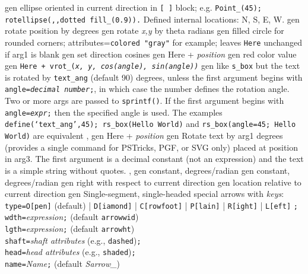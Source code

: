 %
  {gen}%
  {ellipse oriented in current direction in {\tt [ ]} block;
   e.g. {\tt Point\_(45); rotellipse(,{},dotted fill\_(0.9)).} Defined
   internal locations: N, S, E, W.}%
%
  {gen}%
  {rotate position by degrees}%
%
  {gen}%
  {rotate {\sl x,y} by theta radians}%
%
  {gen}%
  {filled circle for rounded corners; attributes={\tt colored
  "gray"}%
   for example; leaves {\tt Here} unchanged if arg1 is blank
    }%
%
  {gen}%
  {set direction cosines}%
%
  {gen}%
  {Here + {\sl position}}%
%
  {gen}%
  {red color value}%
%
  {gen}%
  {\tt Here + vrot\_({\sl x, y, cos(angle), sin(angle))}}%
%
  {gen}%
  {like {\tt s\_box} but the text is rotated by {\tt text\_ang}%
   (default 90) degrees, unless
   the first argument begins with {\tt angle={\sl decimal number};},
   in which case the number defines the rotation angle.
   Two or more args are passed to {\tt sprintf()}.
   If the first argument begins with {\tt angle={\sl expr};} then
   the specified angle is used.
   The examples {\tt define(`text\_ang',45); rs\_box(Hello World)} and
   {\tt rs\_box(angle=45; Hello World)} are equivalent
   , }%
%
  {gen}%
  {Here + {\sl position}}%
%
  {gen}%
  {Rotate text by arg1 degrees (provides a single command for
   PSTricks, PGF, or SVG only) placed at position in arg3.
   The first argument is a decimal constant (not an expression) and
   the text is a simple string without quotes.
   , }%
%
  {gen}%
  {constant, degrees/radian}%
%
  {gen}%
  {constant, degrees/radian}%
%
  {gen}%
  {right with respect to current direction}%
%
  {gen}%
  {location relative to current direction}%
%
%
%
  {gen}%
  {Single-segment, single-headed special arrows with {\sl keys}:\\
       {\tt type=}{\tt O[pen]} (default)
          | {\tt D[iamond]} | {\tt C[rowfoot]} | {\tt P[lain]}%
          | {\tt R[ight]} | {\tt L[eft]} {\tt ;}\\
       {\tt wdth=}{\sl expression}{\tt ;} (default {\tt arrowwid})\\
       {\tt lgth=}{\sl expression}{\tt ;} (default {\tt arrowht})\\
       {\tt shaft=}{\sl shaft attributes} (e.g., {\tt dashed}){\tt ;}\\
       {\tt head=}{\sl head attributes} (e.g., {\tt shaded}){\tt ;}\\
       {\tt name=}{\sl Name}{\tt ;} (default {\sl Sarrow\_})
  }%

